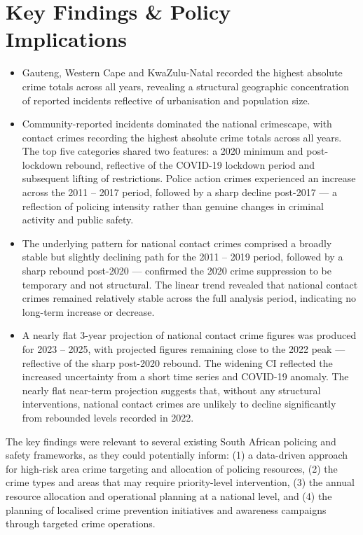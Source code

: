 \documentclass[titlepage, 12pt, oneside]{article}
\begin{document}
\section*{Key Findings \& Policy Implications}
\begin{tcolorbox}[
	colback=darkgreen!8!white,
	colframe=darkgreen,
	title={\textbf{Key Findings}},
	fonttitle=\bfseries,
	rounded corners,
	breakable]
	\begin{itemize}
		\item Gauteng, Western Cape and KwaZulu-Natal recorded the highest absolute crime totals across all years, revealing a structural geographic concentration of reported incidents reflective of urbanisation and population size.
		\item Community-reported incidents dominated the national crimescape, with contact crimes recording the highest absolute crime totals across all years. The top five categories shared two features: a 2020 minimum and post-lockdown rebound, reflective of the COVID-19 lockdown period and subsequent lifting of restrictions. Police action crimes experienced an increase across the 2011 – 2017 period, followed by a sharp decline post-2017 --- a reflection of
		policing intensity rather than genuine changes in criminal activity and public safety.
		\item The underlying pattern for national contact crimes comprised a broadly stable but slightly declining path for the 2011 – 2019 period, followed by a sharp rebound post-2020 --- confirmed the 2020 crime suppression to be temporary and not structural. The linear trend revealed that national contact crimes remained relatively stable across the full analysis period, indicating no long-term increase or decrease. 
		\item A nearly flat 3-year projection of national contact crime figures was produced for 2023 – 2025, with projected figures remaining close to the 2022 peak --- reflective of the sharp post-2020 rebound. The widening CI reflected the increased uncertainty from a short time series and COVID-19 anomaly. The nearly flat near-term projection suggests that, without any structural interventions, national contact crimes are unlikely to decline significantly from rebounded levels recorded in 2022.
	\end{itemize}
\end{tcolorbox}	

\noindent The key findings were relevant to several existing South African policing and safety frameworks, as they could potentially inform: (1) a data-driven approach for high-risk area crime targeting and allocation of policing resources, (2) the crime types and areas that may require priority-level intervention, (3) the annual resource allocation and operational planning at a national level, and (4) the planning of localised crime prevention initiatives and awareness campaigns through targeted crime operations.
\end{document}
